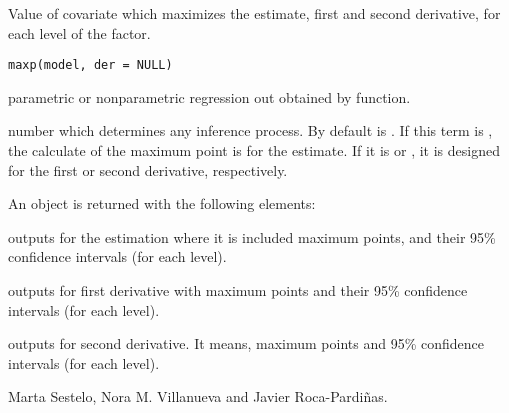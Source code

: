 %
\begin{Description}\relax
Value of covariate  which maximizes the  estimate, first and second derivative, for each level of the factor. 
\end{Description}
%
\begin{Usage}
\begin{verbatim}
maxp(model, der = NULL)
\end{verbatim}
\end{Usage}
%
\begin{Arguments}
\begin{ldescription}
\item[\code{model}] parametric or nonparametric regression out obtained by  function.

\item[\code{der}] number which determines any inference process. By default  is . If this term is , the calculate of the maximum point is for the estimate. If it is  or , it is designed for the first or second derivative, respectively.
\end{ldescription}
\end{Arguments}
%
\begin{Value}
An object is returned with the following elements:
\begin{ldescription}
\item[\code{Estimation}] outputs for the estimation where it is included maximum points, and their 95\% confidence intervals (for each level).
\item[\code{First\_der}] outputs for first derivative with maximum points and their 95\% confidence intervals (for each level).
\item[\code{Second\_der}] outputs for second derivative. It means, maximum points and 95\% confidence intervals (for each level).
\end{ldescription}
\end{Value}
%
\begin{Author}\relax
Marta Sestelo, Nora M. Villanueva and Javier Roca-Pardiñas.
\end{Author}
